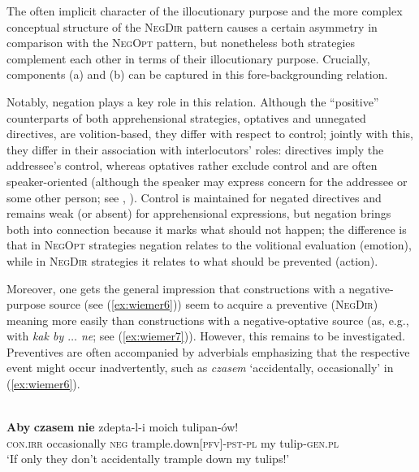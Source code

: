 \documentclass[output=paper,colorlinks,citecolor=brown]{langscibook}
\begin{document}
The often implicit character of the illocutionary purpose and the more complex conceptual structure of the \textsc{NegDir} pattern causes a certain asymmetry in comparison with the \textsc{NegOpt} pattern, but nonetheless both strategies complement each other in terms of their illocutionary purpose. Crucially, components (a) and (b) can be captured in this fore-backgrounding relation.

Notably, negation plays a key role in this relation. Although the “positive” counterparts of both apprehensional strategies, optatives and unnegated directives, are volition-based, they differ with respect to control; jointly with this, they differ in their association with interlocutors' roles: directives imply the addressee's control, whereas optatives rather exclude control and are often speaker-oriented (although the speaker may express concern for the addressee or some other person; see , ). Control is maintained for negated directives and remains weak (or absent) for apprehensional expressions, but negation brings both into connection because it marks what should not happen; the difference is that in \textsc{NegOpt} strategies negation relates to the volitional evaluation (emotion), while in \textsc{NegDir} strategies it relates to what should be prevented (action).

\largerpage

Moreover, one gets the general impression that constructions with a negative-purpose source (see (\ref{ex:wiemer6})) seem to acquire a preventive (\textsc{NegDir}) meaning more easily than constructions with a negative-optative source (as, e.g., with  \textit{kak by $\ldots$  ne}; see (\ref{ex:wiemer7})). However, this remains to be investigated. Preventives are often accompanied by adverbials emphasizing that the respective event might occur inadvertently, such as \textit{czasem} `accidentally, occasionally' in (\ref{ex:wiemer6}).

\ea
\label{ex:wiemer6} 
 \\
\gll \textbf{Aby} \textbf{czasem} \textbf{nie} zdepta-l-i moich tulipan-ów! \\
\textsc{con.irr} occasionally \textsc{neg} trample.down\textsc{[pfv]-pst-pl} my tulip-\textsc{gen.pl} \\
\glt `If only they don't accidentally trample down my tulips!' \\
\z
\end{document}
